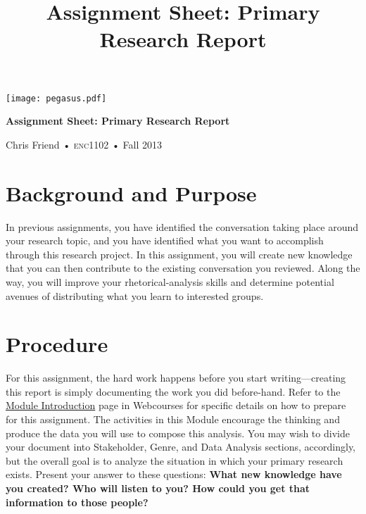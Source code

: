 \documentclass[10pt]{amsart}	%
\title[Primary Research Report]{Assignment Sheet: Primary Research Report}
\begin{document}
%
\thispagestyle{empty}

\vspace{-3in}
\begin{center}
\huge
{\texttt{[image: pegasus.pdf]}}

\textbf{Assignment Sheet: Primary Research Report}

{\normalsize Chris Friend • \textsc{enc1102} • Fall 2013}
\end{center}
\vspace{\baselineskip}

\section{Background and Purpose} %
\label{sec:background}
In previous assignments, you have identified the conversation taking place around your research topic, and you have identified what you want to accomplish through this research project. In this assignment, you will create new knowledge that you can then contribute to the existing conversation you reviewed. Along the way, you will improve your rhetorical-analysis skills and determine potential avenues of distributing what you learn to interested groups.

\section{Procedure} %
\label{sec:procedure}
For this assignment, the hard work happens before you start writing---creating this report is simply documenting the work you did before-hand. Refer to the \href{https://webcourses.ucf.edu/courses/982699/wiki/primary-research-module-4-intro}{Module Introduction} page in Webcourses for specific details on how to prepare for this assignment. The activities in this Module encourage the thinking and produce the data you will use to compose this analysis. You may wish to divide your document into Stakeholder, Genre, and Data Analysis sections, accordingly, but the overall goal is to analyze the situation in which your primary research exists. Present your answer to these questions: \textbf{What new knowledge have you created? Who will listen to you? How could you get that information to those people?}
\end{document}
